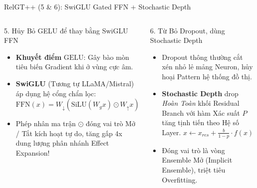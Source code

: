 \documentclass[aspectratio=169,11pt]{beamer}
\begin{document}
\begin{frame}{RelGT++ (5 \& 6): SwiGLU Gated FFN + Stochastic Depth}
\begin{columns}[T]
\begin{block}{5. Hủy Bỏ GELU để thay bằng SwiGLU FFN}
\begin{itemize}
    \item \textbf{Khuyết điểm } $\text{GELU}$: Gây bào mòn tiêu biến Gradient khi ở vùng cực âm.
    \item \textbf{SwiGLU} (Tương tự LLaMA/Mistral) áp dụng hệ cổng chẩn lọc:
    $ \text{FFN}(x) = W_{\downarrow}(\text{SiLU}(W_g x) \odot W_{\uparrow} x) $
    \item Phép nhân ma trận $\odot$ đóng vai trò Mở / Tắt kích hoạt tự do, tăng gấp 4x dung lượng phân nhánh Effect Expansion!
\end{itemize}
\end{block}

\begin{block}{6. Từ Bỏ Dropout, dùng Stochastic Depth}
\begin{itemize}
    \item Dropout thông thường cắt xén nhỏ lẻ mảng Neuron, hủy hoại Pattern hệ thống đồ thị.
    \item \textbf{Stochastic Depth} drop \textit{Hoàn Toàn} khối Residual Branch với hàm Xác suất $P$ tăng tịnh tiến theo Hệ số Layer.
    $ x \leftarrow x_{res} + \frac{b}{1-p}\cdot f(x) $
    \item Đóng vai trò là vòng Ensemble Mở (Implicit Ensemble), triệt tiêu Overfitting.
\end{itemize}
\end{block}
\end{columns}
\end{frame}
\end{document}
